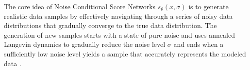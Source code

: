 The core idea of Noise Conditional Score Networks \(s_\theta(x, \sigma)\) is to generate realistic data samples by effectively navigating through a series of noisy data distributions that gradually converge to the true data distribution. The generation of new samples starts with a state of pure noise and uses annealed Langevin dynamics to gradually reduce the noise level \(\sigma\) and ends when a sufficiently low noise level yields a sample that accurately represents the modeled data \citep{song2019SGM}.
